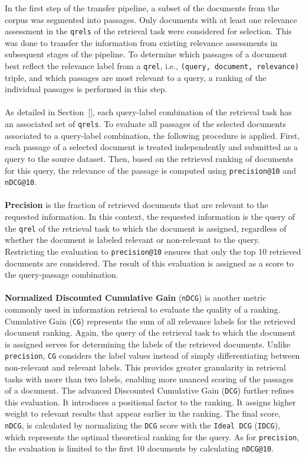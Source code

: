 In the first step of the transfer pipeline, a subset of the documents from the corpus was segmented into passages. Only documents with at least one relevance assessment in the \texttt{qrels} of the retrieval task were considered for selection. This was done to transfer the information from existing relevance assessments in subsequent stages of the pipeline. To determine which passages of a document best reflect the relevance label from a \texttt{qrel}, i.e., \texttt{(query, document, relevance)} triple, and which passages are most relevant to a query, a ranking of the individual passages is performed in this step.
\\\\
As detailed in Section~[], each query-label combination of the retrieval task has an associated set of \texttt{qrels}. To evaluate all passages of the selected documents associated to a query-label combination, the following procedure is applied. First, each passage of a selected document is treated independently and submitted as a query to the source dataset. Then, based on the retrieved ranking of documents for this query, the relevance of the passage is computed using \texttt{precision@10} and \texttt{nDCG@10}.
\\\\
\textbf{Precision} is the fraction of retrieved documents that are relevant to the requested information. In this context, the requested information is the query of the \texttt{qrel} of the retrieval task to which the document is assigned, regardless of whether the document is labeled relevant or non-relevant to the query. Restricting the evaluation to \texttt{precision@10} ensures that only the top 10 retrieved documents are considered. The result of this evaluation is assigned as a score to the query-passage combination.
\\\\
\textbf{Normalized Discounted Cumulative Gain} (\texttt{nDCG}) is another metric commonly used in information retrieval to evaluate the quality of a ranking. Cumulative Gain (\texttt{CG}) represents the sum of all relevance labels for the retrieved document ranking. Again, the query of the retrieval task to which the document is assigned serves for determining the labels of the retrieved documents. Unlike \texttt{precision}, \texttt{CG} considers the label values instead of simply differentiating between non-relevant and relevant labels. This provides greater granularity in retrieval tasks with more than two labels, enabling more nuanced scoring of the passages of a document. The advanced Discounted Cumulative Gain (\texttt{DCG}) further refines this evaluation. It introduces a positional factor to the ranking. It assigns higher weight to relevant results that appear earlier in the ranking. The final score, \texttt{nDCG}, is calculated by normalizing the \texttt{DCG} score with the \texttt{Ideal DCG} (\texttt{IDCG}), which represents the optimal theoretical ranking for the query. As for \texttt{precision}, the evaluation is limited to the first 10 documents by calculating \texttt{nDCG@10}.
